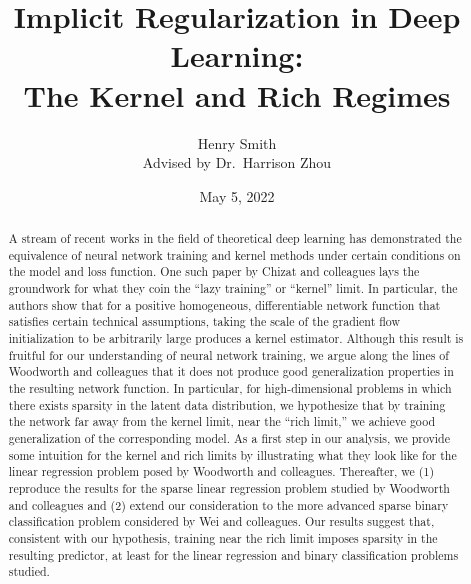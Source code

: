 \documentclass{article}
\title{\textbf{Implicit Regularization in Deep Learning:\\The Kernel and Rich Regimes}}
\author[]{Henry Smith\\
Advised by Dr.~Harrison Zhou}
\affil[]{\normalsize Department of Statistics \& Data Science\\Yale University}
\date{May 5, 2022}
\begin{document}
\maketitle

\begin{abstract}
\noindent
A stream of recent works in the field of theoretical deep learning has demonstrated the equivalence of neural network training and kernel methods under certain conditions on the model and loss function. One such paper by Chizat and colleagues lays the groundwork for what they coin the \enquote{lazy training} or \enquote{kernel} limit. In particular, the authors show that for a positive homogeneous, differentiable network function that satisfies certain technical assumptions, taking the scale of the gradient flow initialization to be arbitrarily large produces a kernel estimator. Although this result is fruitful for our understanding of neural network training, we argue along the lines of Woodworth and colleagues that it does not produce good generalization properties in the resulting network function. In particular, for high-dimensional problems in which there exists sparsity in the latent data distribution, we hypothesize that by training the network far away from the kernel limit, near the \enquote{rich limit,} we achieve good generalization of the corresponding model. As a first step in our analysis, we provide some intuition for the kernel and rich limits by illustrating what they look like for the linear regression problem posed by Woodworth and colleagues. Thereafter, we (1) reproduce the results for the sparse linear regression problem studied by Woodworth and colleagues and (2) extend our consideration to the more advanced sparse binary classification problem considered by Wei and colleagues. Our results suggest that, consistent with our hypothesis, training near the rich limit imposes sparsity in the resulting predictor, at least for the linear regression and binary classification problems studied.
\end{abstract}

\pagebreak

\vspace*{\fill}


\end{document}
